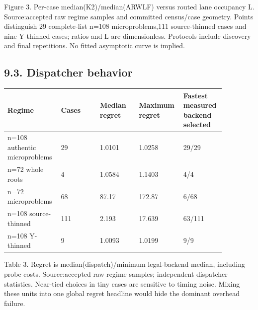 \documentclass[10pt,letterpaper]{article}
\begin{document}
\begin{center}
\end{center}


{\small\color{teal}Figure 3. Per-case median(K2)/median(ARWLF) versus routed lane occupancy L. Source:accepted raw regime samples and committed census/case geometry. Points distinguish 29 complete-list n=108 microproblems,111 source-thinned cases and nine Y-thinned cases; ratios and L are dimensionless. Protocols include discovery and final repetitions. No fitted asymptotic curve is implied.\par}

\subsection*{9.3. Dispatcher behavior}

{\small\setlength{\tabcolsep}{3pt}\begin{longtable}{p{0.174\linewidth} p{0.174\linewidth} p{0.174\linewidth} p{0.174\linewidth} p{0.174\linewidth}}
\toprule

\textbf{Regime} & \textbf{Cases} & \textbf{Median regret} & \textbf{Maximum regret} & \textbf{Fastest measured backend selected} \\
\midrule\endhead

n=108 authentic microproblems & 29 & 1.0101 & 1.0258 & 29/29 \\

n=72 whole roots & 4 & 1.0584 & 1.1403 & 4/4 \\

n=72 microproblems & 68 & 87.17 & 172.87 & 6/68 \\

n=108 source-thinned & 111 & 2.193 & 17.639 & 63/111 \\

n=108 Y-thinned & 9 & 1.0093 & 1.0199 & 9/9 \\

\bottomrule\end{longtable}}

{\small\color{teal}Table 3. Regret is median(dispatch)/minimum legal-backend median, including probe costs. Source:accepted raw regime samples; independent dispatcher statistics. Near-tied choices in tiny cases are sensitive to timing noise. Mixing these units into one global regret headline would hide the dominant overhead failure.\par}
\end{document}

